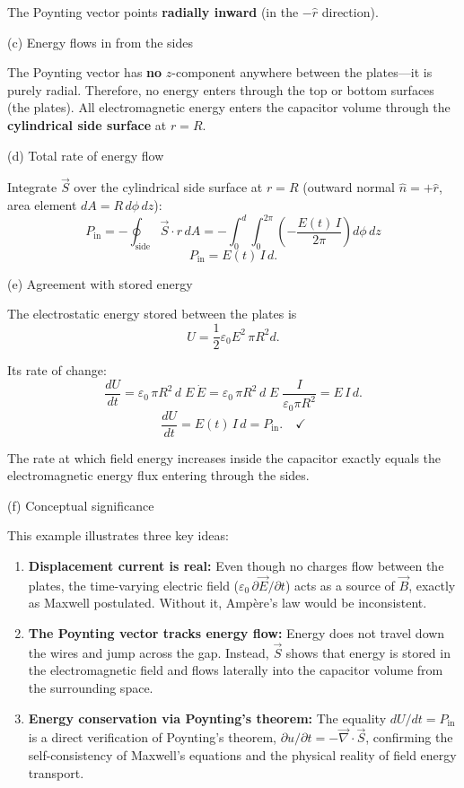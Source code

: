 \documentclass[12pt]{article}
\begin{document}
\begin{enumerate}
The Poynting vector points \textbf{radially inward} (in the $-\hat{r}$ direction).

(c) Energy flows in from the sides

The Poynting vector has \textbf{no} $\hat{z}$-component anywhere between the plates---it is purely radial. Therefore, no energy enters through the top or bottom surfaces (the plates). All electromagnetic energy enters the capacitor volume through the \textbf{cylindrical side surface} at $r=R$.

(d) Total rate of energy flow

Integrate $\vec{S}$ over the cylindrical side surface at $r=R$ (outward normal $\hat{n}=+\hat{r}$, area element $dA = R\,d\phi\,dz$):
\[
P_{\text{in}}
= -\oint_{\text{side}}\vec{S}\cdot\hat{r}\,dA
= -\int_0^d\int_0^{2\pi}\left(-\frac{E(t)\,I}{2\pi}\right)d\phi\,dz
\]
\[
\boxed{P_{\text{in}} = E(t)\,I\,d.}
\]

(e) Agreement with stored energy

The electrostatic energy stored between the plates is
\[
U = \frac{1}{2}\varepsilon_0 E^2\,\pi R^2 d.
\]

Its rate of change:
\[
\frac{dU}{dt}
= \varepsilon_0\,\pi R^2\,d\;E\,\dot{E}
= \varepsilon_0\,\pi R^2\,d\;E\;\frac{I}{\varepsilon_0\pi R^2}
= E\,I\,d.
\]
\[
\boxed{\frac{dU}{dt} = E(t)\,I\,d = P_{\text{in}}.} \quad \checkmark
\]

The rate at which field energy increases inside the capacitor exactly equals the electromagnetic energy flux entering through the sides.

(f) Conceptual significance

This example illustrates three key ideas:
\begin{enumerate}
    \item \textbf{Displacement current is real:} Even though no charges flow between the plates, the time-varying electric field ($\varepsilon_0\,\partial\vec{E}/\partial t$) acts as a source of $\vec{B}$, exactly as Maxwell postulated. Without it, Amp\`ere's law would be inconsistent.
    \item \textbf{The Poynting vector tracks energy flow:} Energy does not travel down the wires and jump across the gap. Instead, $\vec{S}$ shows that energy is stored in the electromagnetic field and flows laterally into the capacitor volume from the surrounding space.
    \item \textbf{Energy conservation via Poynting's theorem:} The equality $dU/dt = P_{\text{in}}$ is a direct verification of Poynting's theorem, $\partial u/\partial t = -\vec{\nabla}\cdot\vec{S}$, confirming the self-consistency of Maxwell's equations and the physical reality of field energy transport.
\end{enumerate}


\end{enumerate}
\end{document}
